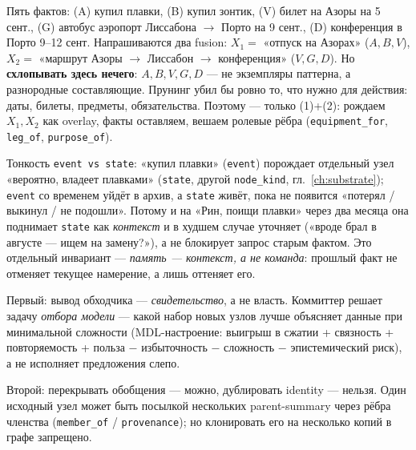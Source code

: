 \begin{workedbox}
Пять фактов: (A) купил плавки, (B) купил зонтик, (V) билет на Азоры на
5 сент., (G) автобус аэропорт Лиссабона $\to$ Порто на 9 сент., (D)
конференция в Порто 9--12 сент. Напрашиваются два fusion:
$X_1 =$ «отпуск на Азорах» ($A, B, V$), $X_2 =$ «маршрут
Азоры $\to$ Лиссабон $\to$ конференция» ($V, G, D$). Но \textbf{схлопывать
здесь нечего}: $A, B, V, G, D$ --- не экземпляры паттерна, а разнородные
составляющие. Прунинг убил бы ровно то, что нужно для действия: даты,
билеты, предметы, обязательства. Поэтому --- только (1)+(2): рождаем
$X_1, X_2$ как overlay, факты оставляем, вешаем ролевые рёбра
(\texttt{equipment\_for}, \texttt{leg\_of}, \texttt{purpose\_of}).

Тонкость \texttt{event vs state}: «купил плавки» (\texttt{event}) порождает
отдельный узел «вероятно, владеет плавками» (\texttt{state}, другой
\texttt{node\_kind}, гл.~\ref{ch:substrate}); \texttt{event} со временем уйдёт
в архив, а \texttt{state} живёт, пока не появится «потерял / выкинул / не
подошли». Потому и на «Рин, поищи плавки» через два месяца она поднимает
\texttt{state} как \emph{контекст} и в худшем случае уточняет («вроде брал в
августе --- ищем на замену?»), а не блокирует запрос старым фактом. Это
отдельный инвариант --- \emph{память --- контекст, а не команда}: прошлый
факт не отменяет текущее намерение, а лишь оттеняет его.
\end{workedbox}

\begin{principle}
Первый: вывод обходчика --- \emph{свидетельство}, а не власть. Коммиттер
решает задачу \emph{отбора модели} --- какой набор новых узлов лучше
объясняет данные при минимальной сложности (MDL-настроение: выигрыш в
сжатии + связность + повторяемость + польза $-$ избыточность $-$ сложность
$-$ эпистемический риск), а не исполняет предложения слепо.

Второй: перекрывать обобщения --- можно, дублировать identity --- нельзя.
Один исходный узел может быть посылкой нескольких parent-summary через рёбра
членства (\texttt{member\_of} / \texttt{provenance}); но клонировать его на
несколько копий в графе запрещено.
\end{principle}

